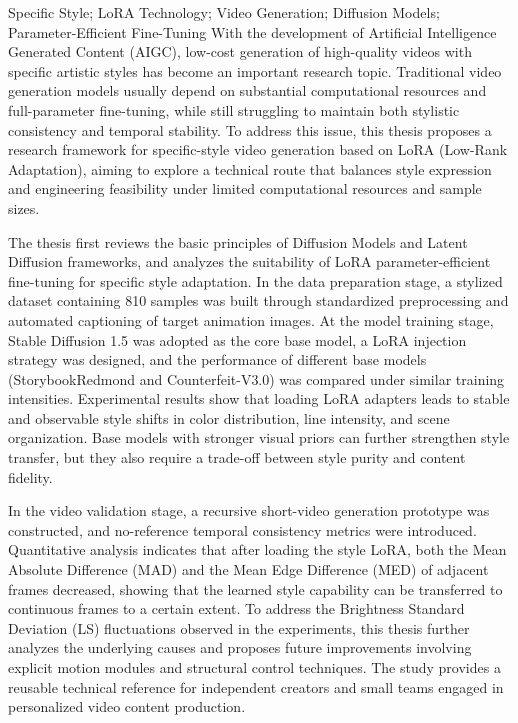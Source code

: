 \begin{enabstract}{Specific Style; LoRA Technology; Video Generation; Diffusion Models; Parameter-Efficient Fine-Tuning}
With the development of Artificial Intelligence Generated Content (AIGC), low-cost generation of high-quality videos with specific artistic styles has become an important research topic. Traditional video generation models usually depend on substantial computational resources and full-parameter fine-tuning, while still struggling to maintain both stylistic consistency and temporal stability. To address this issue, this thesis proposes a research framework for specific-style video generation based on LoRA (Low-Rank Adaptation), aiming to explore a technical route that balances style expression and engineering feasibility under limited computational resources and sample sizes.

The thesis first reviews the basic principles of Diffusion Models and Latent Diffusion frameworks, and analyzes the suitability of LoRA parameter-efficient fine-tuning for specific style adaptation. In the data preparation stage, a stylized dataset containing 810 samples was built through standardized preprocessing and automated captioning of target animation images. At the model training stage, Stable Diffusion 1.5 was adopted as the core base model, a LoRA injection strategy was designed, and the performance of different base models (StorybookRedmond and Counterfeit-V3.0) was compared under similar training intensities. Experimental results show that loading LoRA adapters leads to stable and observable style shifts in color distribution, line intensity, and scene organization. Base models with stronger visual priors can further strengthen style transfer, but they also require a trade-off between style purity and content fidelity.

In the video validation stage, a recursive short-video generation prototype was constructed, and no-reference temporal consistency metrics were introduced. Quantitative analysis indicates that after loading the style LoRA, both the Mean Absolute Difference (MAD) and the Mean Edge Difference (MED) of adjacent frames decreased, showing that the learned style capability can be transferred to continuous frames to a certain extent. To address the Brightness Standard Deviation (LS) fluctuations observed in the experiments, this thesis further analyzes the underlying causes and proposes future improvements involving explicit motion modules and structural control techniques. The study provides a reusable technical reference for independent creators and small teams engaged in personalized video content production.
\end{enabstract}
